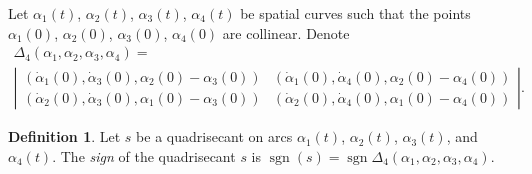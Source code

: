 \documentclass{article}
\theoremstyle{definition}
\newtheorem{definition}{Definition}
\theoremstyle{remark}
\DeclareMathOperator{\sgn}{\mathrm{sgn}}
\begin{document}
Let $\alpha_1(t)$, $\alpha_2(t)$, $\alpha_3(t)$, $\alpha_4(t)$ be spatial curves such that the points $\alpha_1(0)$, $\alpha_2(0)$, $\alpha_3(0)$, $\alpha_4(0)$ are collinear. Denote
\begin{multline}\label{eq:delta4}
\Delta_4(\alpha_1,\alpha_2,\alpha_3,\alpha_4)=\\
\left|\begin{array}{cc}
       (\dot\alpha_1(0),\dot\alpha_3(0),\alpha_2(0)-\alpha_3(0))  & (\dot\alpha_1(0),\dot\alpha_4(0),\alpha_2(0)-\alpha_4(0)) \\
        (\dot\alpha_2(0),\dot\alpha_3(0),\alpha_1(0)-\alpha_3(0)) & (\dot\alpha_2(0),\dot\alpha_4(0),\alpha_1(0)-\alpha_4(0))
    \end{array}\right|.
\end{multline}

\begin{definition}\label{def:4secant_sign}
Let $s$ be a quadrisecant on arcs $\alpha_1(t)$, $\alpha_2(t)$, $\alpha_3(t)$, and $\alpha_4(t)$. The \emph{sign} of the quadrisecant $s$ is $\sgn(s)=\sgn\Delta_4(\alpha_1,\alpha_2,\alpha_3,\alpha_4)$.
\end{definition}
\end{document}
